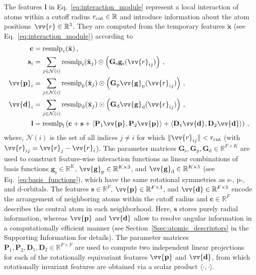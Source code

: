 \documentclass[%
superscriptaddress,
reprint,
nofootinbib,
amsmath,amssymb,amsfonts,
floatfix,
altaffilletter,
showkeys,
]{revtex4-2}
\begin{document}
The features $\mathbf{l}$ in Eq.~\ref{eq:interaction_module} represent a local interaction of atoms within a cutoff radius $r_{\rm cut}\in\mathbb{R}$ and introduce information about the atom positions~$\vv{r}\in\mathbb{R}^3$. They are computed from the temporary features $\tilde{\mathbf{x}}$ (see Eq.~\ref{eq:interaction_module}) according to
\begin{equation}
\begin{aligned}
\mathbf{c} &= \mathrm{resmlp}_\mathrm{c}(\tilde{\mathbf{x}})\,,\\
\mathbf{s}_i &= \sum_{j\in\mathcal{N}(i)}   \mathrm{resmlp}_\mathrm{s}(\tilde{\mathbf{x}}_j) \odot \left(\mathbf{G}_\mathrm{s}\mathbf{g}_\mathrm{s}(\vv{r}_{ij})\right)\,,\\
\vv{\mathbf{p}}_i &= \sum_{j\in \mathcal{N}(i)}  \mathrm{resmlp}_\mathrm{p}(\tilde{\mathbf{x}}_j) \odot \left(\mathbf{G}_\mathrm{p}\vv{\mathbf{g}}_\mathrm{p}(\vv{r}_{ij})\right)\,,\\
\vv{\mathbf{d}}_i &= \sum_{j\in \mathcal{N}(i)}   \mathrm{resmlp}_\mathrm{d}(\tilde{\mathbf{x}}_j) \odot \left(\mathbf{G}_\mathrm{d}\vv{\mathbf{g}}_\mathrm{d}(\vv{r}_{ij})\right)\,,\\
\mathbf{l} &= \mathrm{resmlp}_\mathrm{l}\left(\mathbf{c} + \mathbf{s} + \langle\mathbf{P}_1\vv{\mathbf{p}},\mathbf{P}_2\vv{\mathbf{p}}\rangle + \langle\mathbf{D}_1\vv{\mathbf{d}},\mathbf{D}_2\vv{\mathbf{d}}\rangle\right)\,,
\end{aligned}
\label{eq:local_interaction}
\end{equation}
where, $\mathcal{N}(i)$ is the set of all indices $j\neq i$ for which $\lVert \vv{r}_{ij}\rVert < r_{\rm cut}$ (with $\vv{r}_{ij} = \vv{r}_{j}-\vv{r}_{i}$). The parameter matrices $\mathbf{G}_\mathrm{s},\mathbf{G}_\mathrm{p},\mathbf{G}_\mathrm{d}\in\mathbb{R}^{F\times K}$ are used to construct feature-wise interaction functions as linear combinations of basis functions $\mathbf{g}_\mathrm{s}\in\mathbb{R}^K$, $\vv{\mathbf{g}}_\mathrm{p}\in\mathbb{R}^{K\times3}$, and  $\vv{\mathbf{g}}_\mathrm{d}\in\mathbb{R}^{K\times5}$ (see Eq.~\ref{eq:basis_functions}), which have the same rotational symmetries as s-, p-, and d-orbitals. The features $\mathbf{s}\in\mathbb{R}^{F}$,  $\vv{\mathbf{p}}\in\mathbb{R}^{F\times3}$, and $\vv{\mathbf{d}}\in\mathbb{R}^{F\times5}$ encode the arrangement of neighboring atoms within the cutoff radius and $\mathbf{c}\in\mathbb{R}^{F}$ describes the central atom in each neighborhood. Here, $\mathbf{s}$ stores purely radial information, whereas $\vv{\mathbf{p}}$ and $\vv{\mathbf{d}}$ allow to resolve angular information in a computationally efficient manner (see Section~\ref{Ssec:atomic_descriptors} in the Supporting Information for details).  The parameter matrices $\mathbf{P}_1, \mathbf{P}_2, \mathbf{D}_1, \mathbf{D}_2 \in \mathbb{R}^{F\times F}$ are used to compute two independent linear projections for each of the rotationally equivariant features $\vv{\mathbf{p}}$ and $\vv{\mathbf{d}}$, from which rotationally invariant features are obtained via a scalar product $\langle\cdot,\cdot\rangle$. %
\end{document}
